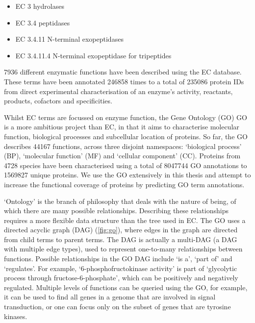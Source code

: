 \begin{itemize}
    \item EC 3 hydrolases
    \item EC 3.4 peptidases
    \item EC 3.4.11 N-terminal exopeptidases
    \item EC 3.4.11.4 N-terminal exopeptidase for tripeptides
\end{itemize}

\num{7936} different enzymatic functions have been described using the EC database.
These terms have been annotated \num{246858} times to a total of \num{235086} protein IDs from direct experimental characterisation of an enzyme's activity, reactants, products, cofactors and specificities.

Whilst EC terms are focussed on enzyme function, the Gene Ontology (GO) GO \cite{Carbon2018} is a more ambitious project than EC, in that it aims to characterise molecular function, biological processes and subcellular location of proteins.
So far, the GO describes \num{44167} functions, across three disjoint namespaces: `biological process' (BP), `molecular function' (MF) and `cellular component' (CC).
Proteins from \num{4728} species have been characterised using a total of \num{8047744} GO annotations to \num{1569827} unique proteins.
We use the GO extensively in this thesis and attempt to increase the functional coverage of proteins by predicting GO term annotations.







`Ontology' is the branch of philosophy that deals with the nature of being, of which there are many possible relationships.
Describing these relationships requires a more flexible data structure than the tree used in EC.
The GO uses a directed acyclic graph (DAG) (\ref{fig:go}), where edges in the graph are directed from child terms to parent terms.
The DAG is actually a multi-DAG (a DAG with multiple edge types), used to represent one-to-many relationships between functions.
Possible relationships in the GO DAG include `is a', `part of' and `regulates'.
For example, `6-phosphofructokinase activity' is part of `glycolytic process through fructose-6-phosphate', which can be positively and negatively regulated.
Multiple levels of functions can be queried using the GO, for example, it can be used to find all genes in a genome that are involved in signal transduction, or one can focus only on the subset of genes that are tyrosine kinases.

